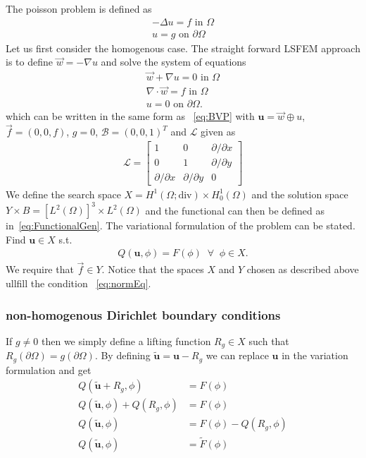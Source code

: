 The poisson problem is defined as 
\begin{align}
	-\Delta u = f \text{ in } \Omega \\
	u = g \text{ on } \partial \Omega
	\label{eq:Poisson}
\end{align}
Let us first consider the homogenous case. The straight forward LSFEM approach is to define $\vec{w} = -\nabla u$ and solve the system of equations 
\begin{align}
	\vec{w} + \nabla u = 0 \text{ in } \Omega \\
	\nabla \cdot \vec{w} = f \text{ in } \Omega \\
	u = 0 \text{ on } \partial \Omega.
	\label{eq:PoissonSystem}
\end{align}
which can be written in the same form as ~\ref{eq:BVP} with $ \mathbf{u} = \vec{w} \oplus u $, $\vec{f} = (0,0,f)$, $g=0$, $\mathcal{B} = (0,0,1)^T $ and $\mathcal{L}$ given as 
\begin{align}
	\mathcal{L} =
	\begin{bmatrix}
		1 & 0 & \partial / \partial x  \\
		0 & 1 & \partial / \partial y  \\
		\partial / \partial x & \partial/ \partial y  & 0
	\end{bmatrix}
	\label{eq:Amatrix}
\end{align}
We define the search space $X =  H^1(\Omega;\text{div}) \times H_0^1(\Omega)$ and the solution space $Y \times B  = [L^2(\Omega)]^3\times L^2(\Omega) $ and the functional can then be defined as in~\ref{eq:FunctionalGen}. The variational formulation of the problem can be stated. Find $ \mathbf{u} \in X $ s.t.
\begin{align}
	Q(\mathbf{u},\phi) = F(\phi) \;\; \forall \;\; \phi \in X.
	\label{eq:VariationalFormulationPoisson}
\end{align}
We require that $\vec{f} \in Y$.
Notice that the spaces $X$ and $Y$ chosen as described above ullfill the condition ~\ref{eq:normEq}. 
%
\subsubsection{non-homogenous Dirichlet boundary conditions}
If $g \neq 0$ then we simply define a lifting function $R_g \in X$ such that $R_g(\partial \Omega) = g(\partial \Omega)$. By defining $\tilde{\mathbf{u}}=\mathbf{u}-R_g$ we can replace $\mathbf{u}$ in the variation formulation and get 
\begin{align}
	Q(\tilde{\mathbf{u}}+R_g,\phi) &= F(\phi) \\
	Q(\tilde{\mathbf{u}},\phi)+Q(R_g,\phi) &= F(\phi) \\
	Q(\tilde{\mathbf{u}},\phi) &= F(\phi) - Q(R_g,\phi)\\
	Q(\tilde{\mathbf{u}},\phi) &= \tilde{F}(\phi) 
	\label{eq:liftingFunc}
\end{align}
%
